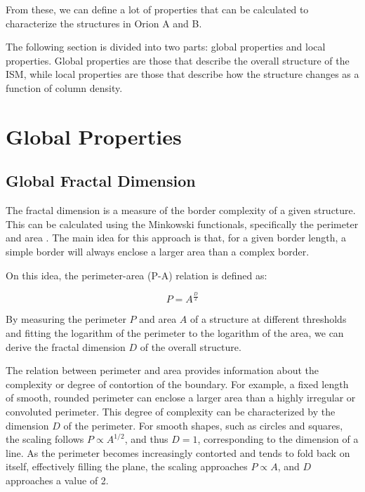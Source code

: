 From these, we can define a lot of properties that can be calculated to characterize the structures in Orion A and B. 

The following section is divided into two parts: global properties and local properties. Global properties are those that describe the overall structure of the ISM, while local properties are those that describe how the structure changes as a function of column density.

\section{Global Properties}

\subsection{Global Fractal Dimension}

The fractal dimension is a measure of the border complexity of a given structure. This can be calculated using the Minkowski functionals, specifically the perimeter and area \cite{cannon1984fractal}. 
The main idea for this approach is that, for a given border length, a simple border will always enclose a larger area than a complex border.

On this idea, the perimeter-area (P-A) relation is defined as:

\begin{equation}
    \label{eq:perimeter_area}
    P = A^{\frac{D}{2}}
\end{equation}

By measuring the perimeter $P$ and area $A$ of a structure at different thresholds and fitting the logarithm of the perimeter to the logarithm of the area, we can derive the fractal dimension $D$ of the overall structure.

The relation between perimeter and area provides information about the complexity or degree of contortion of the boundary. For example, a fixed length of smooth, rounded perimeter can enclose a larger area than a highly irregular or convoluted perimeter. This degree of complexity can be characterized by the dimension $D$ of the perimeter. For smooth shapes, such as circles and squares, the scaling follows $P \propto A^{1/2}$, and thus $D=1$, corresponding to the dimension of a line. As the perimeter becomes increasingly contorted and tends to fold back on itself, effectively filling the plane, the scaling approaches $P \propto A$, and $D$ approaches a value of 2.

